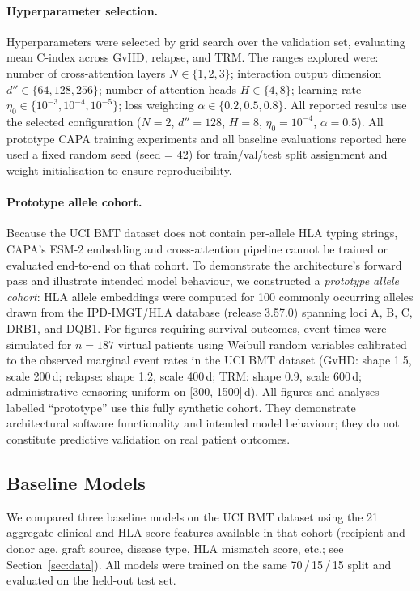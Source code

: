\documentclass[11pt,a4paper]{article}
\begin{document}
\paragraph{Hyperparameter selection.}
Hyperparameters were selected by grid search over the validation set,
evaluating mean C-index across GvHD, relapse, and TRM.  The ranges explored
were: number of cross-attention layers $N \in \{1, 2, 3\}$; interaction output
dimension $d'' \in \{64, 128, 256\}$; number of attention heads $H \in \{4, 8\}$;
learning rate $\eta_0 \in \{10^{-3}, 10^{-4}, 10^{-5}\}$; loss weighting
$\alpha \in \{0.2, 0.5, 0.8\}$.  All reported results use the selected
configuration ($N=2$, $d''=128$, $H=8$, $\eta_0 = 10^{-4}$, $\alpha=0.5$).
All prototype CAPA training experiments and all baseline evaluations reported
here used a fixed random seed (seed = 42) for train/val/test split assignment
and weight initialisation to ensure reproducibility.

\paragraph{Prototype allele cohort.}
\label{sec:prototype}
Because the UCI BMT dataset does not contain per-allele HLA typing strings,
CAPA's ESM-2 embedding and cross-attention pipeline cannot be trained or
evaluated end-to-end on that cohort.  To demonstrate the architecture's forward
pass and illustrate intended model behaviour, we constructed a
\emph{prototype allele cohort}: HLA allele embeddings were computed for 100
commonly occurring alleles drawn from the IPD-IMGT/HLA database (release
3.57.0) spanning loci A, B, C, DRB1, and DQB1.  For figures requiring survival
outcomes, event times were simulated for $n = 187$ virtual patients using Weibull
random variables calibrated to the observed marginal event rates in the UCI BMT
dataset (GvHD: shape 1.5, scale 200\,d; relapse: shape 1.2, scale 400\,d;
TRM: shape 0.9, scale 600\,d; administrative censoring uniform on [300,
1500]\,d).  All figures and analyses labelled ``prototype'' use this
fully synthetic cohort.  They demonstrate architectural software
functionality and intended model behaviour; they do not constitute predictive
validation on real patient outcomes.

\subsection{Baseline Models}
\label{sec:baselines}

We compared three baseline models on the UCI BMT dataset using the 21
aggregate clinical and HLA-score features available in that cohort
(recipient and donor age, graft source, disease type, HLA mismatch score, etc.;
see Section~\ref{sec:data}).  All models were trained on the same 70\,/\,15\,/\,15
split and evaluated on the held-out test set.
\end{document}
